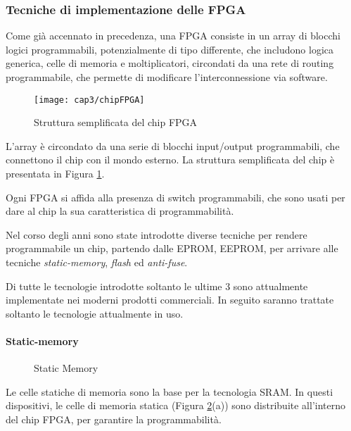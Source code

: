 \subsubsection{Tecniche di implementazione delle FPGA}
Come già accennato in precedenza, una FPGA consiste in un array di blocchi logici programmabili, potenzialmente di tipo differente, che includono logica generica, celle di memoria e moltiplicatori, circondati da una rete di routing programmabile, che permette di modificare l'interconnessione via software.

\begin{figure}  
  \begin{center}
    \texttt{[image: cap3/chipFPGA]}
    \caption{Struttura semplificata del chip FPGA}
    \label{chipFPGA}
  \end{center}
\end{figure}
L'array è circondato da una serie di blocchi input/output programmabili, che connettono il chip con il mondo esterno. La struttura semplificata del chip è presentata in Figura \ref{chipFPGA}.

Ogni FPGA si affida alla presenza di switch programmabili, che sono usati per dare al chip la sua caratteristica di programmabilità.

Nel corso degli anni sono state introdotte diverse tecniche per rendere programmabile un chip, partendo dalle EPROM, EEPROM, per arrivare alle tecniche  \textit{static-memory}, \textit{flash} ed \textit{anti-fuse}.

Di tutte le tecnologie introdotte soltanto le ultime $3$ sono attualmente implementate nei moderni prodotti commerciali. In seguito saranno trattate soltanto le tecnologie attualmente in uso.

\paragraph{Static-memory}
\begin{figure}
\centering
{}
\hspace{5mm}
\hspace{5mm}
\caption{Static Memory}\label{staticmem}
\end{figure}
Le celle statiche di memoria sono la base per la tecnologia SRAM. In questi dispositivi, le celle di memoria statica (Figura \ref{staticmem}(a)) sono distribuite all'interno del chip FPGA, per garantire la programmabilità.

